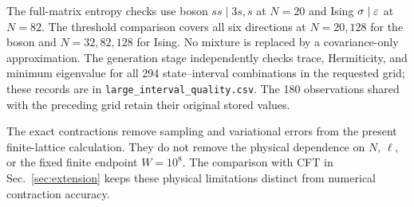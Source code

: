 The full-matrix entropy checks use boson $ss\mid3s,s$ at $N=20$ and
Ising $\sigma\mid\varepsilon$ at $N=82$. The threshold comparison covers all
six directions at $N=20,128$ for the boson and $N=32,82,128$ for Ising.
No mixture is replaced by a covariance-only approximation. The generation
stage independently checks trace, Hermiticity, and minimum eigenvalue for
all 294 state--interval combinations in the requested grid; these records
are in \texttt{large\_interval\_quality.csv}. The 180 observations shared
with the preceding grid retain their original stored values.

The exact contractions remove sampling and variational errors from the
present finite-lattice calculation. They do not remove the physical
dependence on $N$, $\ell$, or the fixed finite endpoint $W=10^8$.
The comparison with CFT in Sec.~\ref{sec:extension} keeps these physical
limitations distinct from numerical contraction accuracy.
